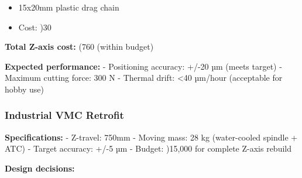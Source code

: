 \documentclass[
]{article}
\providecommand{\tightlist}{%
  \setlength{\itemsep}{0pt}\setlength{\parskip}{0pt}}
\begin{document}
\begin{enumerate}
  \begin{itemize}
  \tightlist
  \item
    15x20mm plastic drag chain
  \item
    Cost: )30
  \end{itemize}
\end{enumerate}

\textbf{Total Z-axis cost:} (760 (within budget)

\textbf{Expected performance:} - Positioning accuracy: +/-20 µm (meets
target) - Maximum cutting force: 300 N - Thermal drift: \textless40
µm/hour (acceptable for hobby use)

\subsubsection{Industrial VMC Retrofit}\label{industrial-vmc-retrofit}

\textbf{Specifications:} - Z-travel: 750mm - Moving mass: 28 kg
(water-cooled spindle + ATC) - Target accuracy: +/-5 µm - Budget:
)15,000 for complete Z-axis rebuild

\textbf{Design decisions:}
\end{document}
